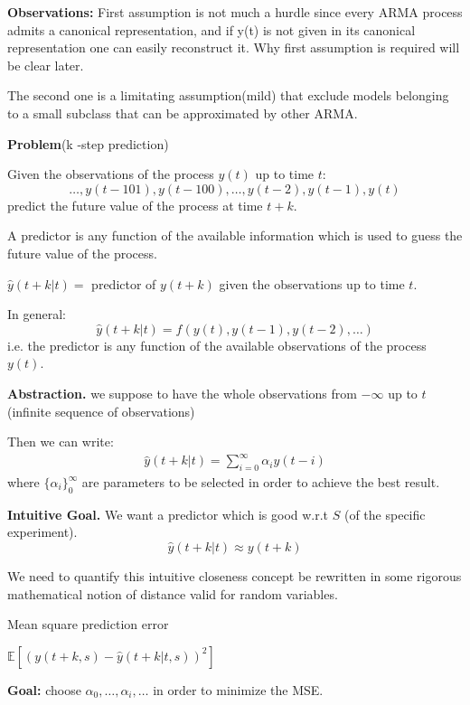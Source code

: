 \textbf{Observations:}
First assumption is not much a hurdle since every ARMA
process admits a canonical representation, and if y(t) is not given in 
its canonical representation one can easily reconstruct it. Why 
first assumption is required will be clear later. 

The second one is a limitating assumption(mild) that exclude models belonging to a small subclass that can be approximated by other ARMA.

\textbf{Problem}(k -step prediction) 

Given the observations of the process $y(t)$ up to time $t$:
$$
\ldots , y(t-101), y(t-100), \ldots , y(t-2), y(t-1), y(t)
$$
predict the future value of the process at time $t + k$.


A predictor is any function of the available information which is used 
to guess the future value of the process.

$\hat{y}(t + k | t) =$ predictor of $y(t + k)$ given the observations up to time $t$.

In general: 
$$\hat{y}(t + k | t) = f ( y(t), y(t-1), y(t-2),\ldots)$$
i.e. the predictor is any function of the available observations of the 
process $y(t)$.

\textbf{Abstraction.} we suppose to have the whole observations from $-\infty$ up to $t$ (infinite sequence of observations)

Then we can write:
\begin{align*}
	\hat{y}(t + k | t)=\sum_{i=0}^{\infty}\alpha_i y(t-i)
\end{align*}
where ${\{\alpha_i\}}_0^\infty$ are parameters to be selected in order to achieve the best result.

\textbf{Intuitive Goal.} 
We want a predictor which is good w.r.t $S$ (of the specific experiment).
$$\hat{y}(t + k | t)\approx y(t+k) $$

We need to quantify this intuitive closeness concept be rewritten in 
some rigorous mathematical notion of distance valid for random variables.

\begin{definition}{Mean square prediction error}
	
	$\mathbb{E}[(y(t+k,s)-\hat{y}(t+k|t,s))^2]$
\end{definition}

\textbf{Goal:} choose $\alpha_0,\ldots,\alpha_i,\ldots$ in order to minimize the MSE.